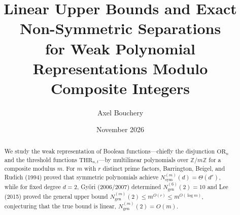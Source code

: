 \documentclass[11pt,a4paper]{article}
\title{\textbf{Linear Upper Bounds and Exact Non-Symmetric Separations\\for Weak Polynomial Representations Modulo Composite Integers}}
\author{Axel Bouchery}
\date{November 2026}
\theoremstyle{definition}
\newcommand{\Z}{\mathbb{Z}}
\newcommand{\OR}{\mathrm{OR}}
\newcommand{\THR}{\mathrm{THR}}
\newcommand{\Nsym}{N_{\mathrm{sym}}}
\newcommand{\Ngen}{N_{\mathrm{gen}}}
\begin{document}
\maketitle

\begin{abstract}
We study the weak representation of Boolean functions---chiefly the disjunction $\OR_n$ and the threshold functions $\THR_{n,t}$---by multilinear polynomials over $\Z/m\Z$ for a composite modulus $m$. For $m$ with $r$ distinct prime factors, Barrington, Beigel, and Rudich (1994) proved that symmetric polynomials achieve $\Nsym^{(m)}(d) = \Theta(d^r)$, while for fixed degree $d=2$, Gy{\H{o}}ri (2006/2007) determined $\Ngen^{(6)}(2) = 10$ and Lee (2015) proved the general upper bound $\Ngen^{(m)}(2) \le m^{O(r)} \le m^{O(\log m)}$, conjecturing that the true bound is linear, $\Ngen^{(m)}(2) = O(m)$.


\end{abstract}
\end{document}

